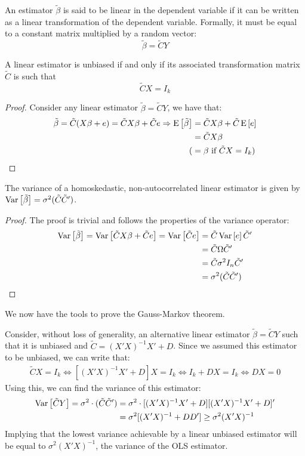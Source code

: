 \begin{definition}
An estimator $\tilde \beta$ is said to be linear in the dependent variable if it can be written as a linear transformation of the dependent variable. Formally, it must be equal to a constant matrix multiplied by a random vector: $$\tilde{\beta} = \tilde{C}Y $$
\end{definition}

\begin{proposition}
A linear estimator is unbiased if and only if its associated transformation matrix $\tilde{C}$ is such that $$\tilde{C}X = I_k$$
\end{proposition}
\begin{proof}
Consider any linear estimator $\tilde{\beta} = \tilde{C}Y$, we have that: \begin{align*}
\tilde{\beta} = \tilde{C}(X\beta + e) = \tilde{C}X\beta + \tilde{C}e \Rightarrow \operatorname{E}\left[\tilde{\beta}\right] & = \tilde{C}X\beta + \tilde{C}\operatorname{E}\left[e\right] \\
& = \tilde{C}X\beta \\ ( & = \beta \text{ if } \tilde{C}X = I_k )
\end{align*}
\end{proof}

\begin{proposition}
The variance of a homoskedastic, non-autocorrelated linear estimator is given by $\operatorname{Var}\left[\tilde{\beta}\right] =  \sigma^2(\tilde{C}\tilde{C}')$.
\end{proposition}
\begin{proof}
The proof is trivial and follows the properties of the variance operator:
\begin{align*}
\operatorname{Var}\left[\tilde{\beta}\right] = \operatorname{Var}\left[\tilde{C}X\beta + \tilde{C}e\right] = \operatorname{Var}\left[\tilde{C}e\right] & = \tilde{C}\operatorname{Var}\left[e\right]\tilde{C}'\\
& = \tilde{C}\Omega\tilde{C}'\\
& = \tilde{C}\sigma^2 I_n\tilde{C}'\\
& = \sigma^2(\tilde{C}\tilde{C}')
\end{align*}
\end{proof}

We now have the tools to prove the Gauss-Markov theorem.

Consider, without loss of generality, an alternative linear estimator $\tilde\beta = \tilde C Y$ such that it is unbiased and $\tilde C = (X'X)^{-1}X' + D$. Since we assumed this estimator to be unbiased, we can write that:\begin{align*}
\tilde C X = I_k \Leftrightarrow [(X'X)^{-1}X' + D]X = I_k \Leftrightarrow I_k + DX = I_k \Leftrightarrow DX = 0
\end{align*}
Using this, we can find the variance of this estimator:\begin{align*}
\operatorname{Var}\left[\tilde C Y\right] = \sigma^2\cdot (\tilde{C}\tilde{C}') & = \sigma^2\cdot [(X'X)^{-1}X' + D][(X'X)^{-1}X' + D]' \\
& = \sigma^2 [(X'X)^{-1} + DD'] \geq \sigma^2(X'X)^{-1}
\end{align*}
Implying that the lowest variance achievable by a linear unbiased estimator will be equal to $\sigma^2(X'X)^{-1}$, the variance of the OLS estimator.

